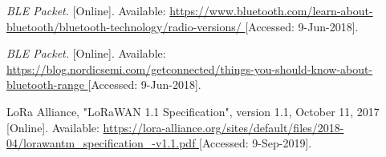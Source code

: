 \begin{thebibliography}{9}








\textit{
BLE Packet.
}
[Online]. Available:
\url{
https://www.bluetooth.com/learn-about-bluetooth/bluetooth-technology/radio-versions/
}
[Accessed: 9-Jun-2018].


\textit{
BLE Packet.
}
[Online]. Available:
\url{
https://blog.nordicsemi.com/getconnected/things-you-should-know-about-bluetooth-range
}
[Accessed: 9-Jun-2018].






LoRa Alliance, "LoRaWAN 1.1 Specification", version 1.1, October 11, 2017
[Online]. Available:
\url{
https://lora-alliance.org/sites/default/files/2018-04/lorawantm_specification_-v1.1.pdf
}
[Accessed: 9-Sep-2019].




\end{thebibliography}
